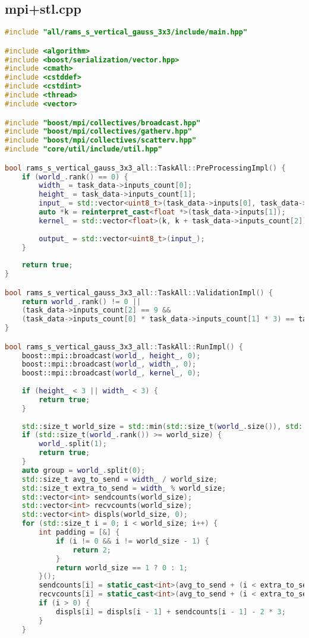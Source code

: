 \documentclass[12pt]{article}
\begin{document}
\subsection{mpi+stl.cpp}

\begin{lstlisting}[language=C++]
#include "all/rams_s_vertical_gauss_3x3/include/main.hpp"

#include <algorithm>
#include <boost/serialization/vector.hpp>
#include <cmath>
#include <cstddef>
#include <cstdint>
#include <thread>
#include <vector>

#include "boost/mpi/collectives/broadcast.hpp"
#include "boost/mpi/collectives/gatherv.hpp"
#include "boost/mpi/collectives/scatterv.hpp"
#include "core/util/include/util.hpp"

bool rams_s_vertical_gauss_3x3_all::TaskAll::PreProcessingImpl() {
	if (world_.rank() == 0) {
		width_ = task_data->inputs_count[0];
		height_ = task_data->inputs_count[1];
		input_ = std::vector<uint8_t>(task_data->inputs[0], task_data->inputs[0] + (height_ * width_ * 3));
		auto *k = reinterpret_cast<float *>(task_data->inputs[1]);
		kernel_ = std::vector<float>(k, k + task_data->inputs_count[2]);
		
		output_ = std::vector<uint8_t>(input_);
	}
	
	return true;
}

bool rams_s_vertical_gauss_3x3_all::TaskAll::ValidationImpl() {
	return world_.rank() != 0 ||
	(task_data->inputs_count[2] == 9 &&
	(task_data->inputs_count[0] * task_data->inputs_count[1] * 3) == task_data->outputs_count[0]);
}

bool rams_s_vertical_gauss_3x3_all::TaskAll::RunImpl() {
	boost::mpi::broadcast(world_, height_, 0);
	boost::mpi::broadcast(world_, width_, 0);
	boost::mpi::broadcast(world_, kernel_, 0);
	
	if (height_ < 3 || width_ < 3) {
		return true;
	}
	
	std::size_t world_size = std::min(std::size_t(world_.size()), std::size_t(width_) - 2);
	if (std::size_t(world_.rank()) >= world_size) {
		world_.split(1);
		return true;
	}
	auto group = world_.split(0);
	std::size_t avg_to_send = width_ / world_size;
	std::size_t extra_to_send = width_ % world_size;
	std::vector<int> sendcounts(world_size);
	std::vector<int> recvcounts(world_size);
	std::vector<int> displs(world_size, 0);
	for (std::size_t i = 0; i < world_size; i++) {
		int padding = [&] {
			if (i != 0 && i != world_size - 1) {
				return 2;
			}
			return world_size == 1 ? 0 : 1;
		}();
		sendcounts[i] = static_cast<int>(avg_to_send + (i < extra_to_send ? 1 : 0) + padding) * 3;
		recvcounts[i] = static_cast<int>(avg_to_send + (i < extra_to_send ? 1 : 0) + padding - 2) * 3;
		if (i > 0) {
			displs[i] = displs[i - 1] + sendcounts[i - 1] - 2 * 3;
		}
	}
	

\end{lstlisting}
\end{document}
